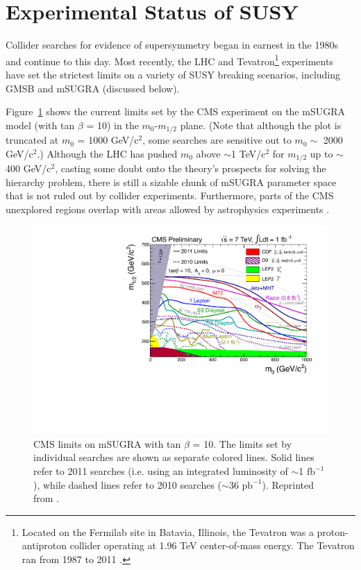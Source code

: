 \documentclass[dissertation.tex]{subfiles}
\begin{document}

\section{Experimental Status of SUSY}

Collider searches for evidence of supersymmetry began in earnest in the 1980s \cite{SUSY_history} and continue to this day.  Most recently, the LHC and Tevatron\footnote{Located on the Fermilab site in Batavia, Illinois, the Tevatron was a proton-antiproton collider operating at 1.96 TeV center-of-mass energy.  The Tevatron ran from 1987 to 2011 \cite{Tevatron_lifetime}.} experiments have set the strictest limits on a variety of SUSY breaking scenarios, including GMSB and mSUGRA (discussed below).

Figure~\ref{fig:CMS_SUSY_2011Limits_tanb10} shows the current limits set by the CMS experiment on the mSUGRA model (with tan $\beta$ = 10) in the $m_{0}$-$m_{1/2}$ plane.  (Note that although the plot is truncated at $m_{0}$ = 1000 GeV/$\mbox{c}^{2}$, some searches are sensitive out to $m_{0} \sim$ 2000 GeV/$\mbox{c}^{2}$.)  Although the LHC has pushed $m_{0}$ above $\sim$1 TeV/$\mbox{c}^{2}$ for $m_{1/2}$ up to $\sim$400 GeV/$\mbox{c}^{2}$, casting some doubt onto the theory's prospects for solving the hierarchy problem, there is still a sizable chunk of mSUGRA parameter space that is not ruled out by collider experiments.  Furthermore, parts of the CMS unexplored regions overlap with areas allowed by astrophysics experiments \cite{CMSSM_fits}.

\begin{figure}
	\centering
	\includegraphics[scale=0.6]{CMS_SUSY_2011Limits_tanb10}
	\caption{CMS limits on mSUGRA with tan $\beta$ = 10.  The limits set by individual searches are shown as separate colored lines.  Solid lines refer to 2011 searches (i.e. using an integrated luminosity of $\sim$1 $\mbox{fb}^{-1}$), while dashed lines refer to 2010 searches ($\sim$36 $\mbox{pb}^{-1}$).  Reprinted from \cite{CMS_mSUGRA}.}
	\label{fig:CMS_SUSY_2011Limits_tanb10}
\end{figure}
\end{document}

